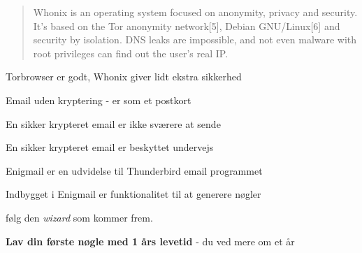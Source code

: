 \documentclass[20pt,landscape,a4paper,footrule]{foils}
\begin{document}


\begin{quote}
Whonix is an operating system focused on anonymity, privacy and security. It's based on the Tor anonymity network[5], Debian GNU/Linux[6] and security by isolation. DNS leaks are impossible, and not even malware with root privileges can find out the user's real IP. 

\end{quote}

\centerline{Torbrowser er godt, Whonix giver lidt ekstra sikkerhed}







\centerline{Email uden kryptering - er som et postkort}






\centerline{En sikker krypteret email er ikke sværere at sende}



\centerline{En sikker krypteret email er beskyttet undervejs}



Enigmail er en udvidelse til Thunderbird email programmet\\ 



\begin{list2}
\item Indbygget i Enigmail er funktionalitet til at generere nøgler
\item følg den \emph{wizard} som kommer frem.
\item {\bf Lav din første nøgle med 1 års levetid} - du ved mere om et år \smiley
\end{list2}
\end{document}

